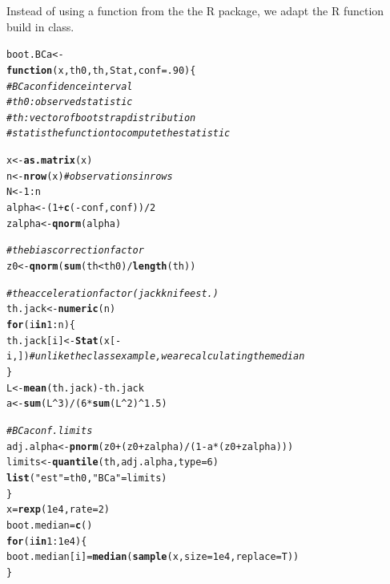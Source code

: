 \documentclass{article}\usepackage[]{graphicx}\usepackage[]{color}
\makeatletter
\newcommand{\hlnum}[1]{\textcolor[rgb]{0.686,0.059,0.569}{#1}}%
\newcommand{\hlstr}[1]{\textcolor[rgb]{0.192,0.494,0.8}{#1}}%
\newcommand{\hlcom}[1]{\textcolor[rgb]{0.678,0.584,0.686}{\textit{#1}}}%
\newcommand{\hlopt}[1]{\textcolor[rgb]{0,0,0}{#1}}%
\newcommand{\hlstd}[1]{\textcolor[rgb]{0.345,0.345,0.345}{#1}}%
\newcommand{\hlkwa}[1]{\textcolor[rgb]{0.161,0.373,0.58}{\textbf{#1}}}%
\newcommand{\hlkwb}[1]{\textcolor[rgb]{0.69,0.353,0.396}{#1}}%
\newcommand{\hlkwc}[1]{\textcolor[rgb]{0.333,0.667,0.333}{#1}}%
\newcommand{\hlkwd}[1]{\textcolor[rgb]{0.737,0.353,0.396}{\textbf{#1}}}%
\newenvironment{kframe}{%
 \def\at@end@of@kframe{}%
 \ifinner\ifhmode%
  \def\at@end@of@kframe{\end{minipage}}%
  \begin{minipage}{\columnwidth}%
 \fi\fi%
 \def\FrameCommand##1{\hskip\@totalleftmargin \hskip-\fboxsep
 \colorbox{shadecolor}{##1}\hskip-\fboxsep
     \hskip-\linewidth \hskip-\@totalleftmargin \hskip\columnwidth}%
 \MakeFramed {\advance\hsize-\width
   \@totalleftmargin\z@ \linewidth\hsize
   \@setminipage}}%
 {\par\unskip\endMakeFramed%
 \at@end@of@kframe}
\newenvironment{knitrout}{}{} %
\makeatother
\begin{document}
Instead of using a function from the the R package, we adapt the R function build in class.
\begin{knitrout}
\color{fgcolor}\begin{kframe}
\begin{alltt}
\hlstd{boot.BCa} \hlkwb{<-}
  \hlkwa{function}\hlstd{(}\hlkwc{x}\hlstd{,} \hlkwc{th0}\hlstd{,} \hlkwc{th}\hlstd{,} \hlkwc{Stat}\hlstd{,} \hlkwc{conf} \hlstd{=} \hlnum{.90}\hlstd{) \{}
    \hlcom{# BCa confidence interval}
    \hlcom{# th0: observed statistic}
    \hlcom{# th: vector of bootstrap distribution}
    \hlcom{# stat is the function to compute the statistic}

    \hlstd{x} \hlkwb{<-} \hlkwd{as.matrix}\hlstd{(x)}
    \hlstd{n} \hlkwb{<-} \hlkwd{nrow}\hlstd{(x)} \hlcom{#observations in rows}
    \hlstd{N} \hlkwb{<-} \hlnum{1}\hlopt{:}\hlstd{n}
    \hlstd{alpha} \hlkwb{<-} \hlstd{(}\hlnum{1} \hlopt{+} \hlkwd{c}\hlstd{(}\hlopt{-}\hlstd{conf, conf))}\hlopt{/}\hlnum{2}
    \hlstd{zalpha} \hlkwb{<-} \hlkwd{qnorm}\hlstd{(alpha)}

    \hlcom{# the bias correction factor}
    \hlstd{z0} \hlkwb{<-} \hlkwd{qnorm}\hlstd{(}\hlkwd{sum}\hlstd{(th} \hlopt{<} \hlstd{th0)} \hlopt{/} \hlkwd{length}\hlstd{(th))}

    \hlcom{# the acceleration factor (jackknife est.)}
    \hlstd{th.jack} \hlkwb{<-} \hlkwd{numeric}\hlstd{(n)}
    \hlkwa{for} \hlstd{(i} \hlkwa{in} \hlnum{1}\hlopt{:}\hlstd{n) \{}
      \hlstd{th.jack[i]} \hlkwb{<-} \hlkwd{Stat}\hlstd{(x[}\hlopt{-}\hlstd{i, ])} \hlcom{#unlike the class example, we are calculating the median }
    \hlstd{\}}
    \hlstd{L} \hlkwb{<-} \hlkwd{mean}\hlstd{(th.jack)} \hlopt{-} \hlstd{th.jack}
    \hlstd{a} \hlkwb{<-} \hlkwd{sum}\hlstd{(L}\hlopt{^}\hlnum{3}\hlstd{)}\hlopt{/}\hlstd{(}\hlnum{6} \hlopt{*} \hlkwd{sum}\hlstd{(L}\hlopt{^}\hlnum{2}\hlstd{)}\hlopt{^}\hlnum{1.5}\hlstd{)}

    \hlcom{# BCa conf. limits}
    \hlstd{adj.alpha} \hlkwb{<-} \hlkwd{pnorm}\hlstd{(z0} \hlopt{+} \hlstd{(z0}\hlopt{+}\hlstd{zalpha)}\hlopt{/}\hlstd{(}\hlnum{1}\hlopt{-}\hlstd{a}\hlopt{*}\hlstd{(z0}\hlopt{+}\hlstd{zalpha)))}
    \hlstd{limits} \hlkwb{<-} \hlkwd{quantile}\hlstd{(th, adj.alpha,} \hlkwc{type}\hlstd{=}\hlnum{6}\hlstd{)}
    \hlkwd{list}\hlstd{(}\hlstr{"est"}\hlstd{=th0,} \hlstr{"BCa"}\hlstd{=limits)}
  \hlstd{\}}
\hlstd{x} \hlkwb{=} \hlkwd{rexp}\hlstd{(}\hlnum{1e4}\hlstd{,} \hlkwc{rate} \hlstd{=} \hlnum{2}\hlstd{)}
\hlstd{boot.median} \hlkwb{=} \hlkwd{c}\hlstd{()}
\hlkwa{for}\hlstd{(i} \hlkwa{in} \hlnum{1}\hlopt{:}\hlnum{1e4}\hlstd{)\{}
  \hlstd{boot.median[i]} \hlkwb{=} \hlkwd{median}\hlstd{(}\hlkwd{sample}\hlstd{(x,} \hlkwc{size} \hlstd{=} \hlnum{1e4}\hlstd{,} \hlkwc{replace} \hlstd{= T))}
  \hlstd{\}}


\end{alltt}
\end{kframe}
\end{knitrout}
\end{document}
